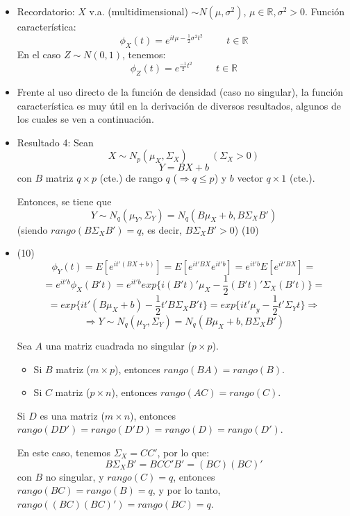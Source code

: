 \documentclass[11pt,a4paper]{article}
\begin{document}
\begin{itemize}
\item Recordatorio: $X$ v.a. (multidimensional) $\sim N(\mu, \sigma^{2})$, $\mu \in \mathbb{R}, \sigma^{2} > 0$. Función característica:
$$\phi_{X}(t) = e^{it\mu - \frac{1}{2}\sigma^{2}t^{2}} \hspace{1cm} t \in \mathbb{R}$$
En el caso $Z \sim N(0, 1)$, tenemos:
$$\phi_{Z}(t) = e^{\frac{-1}{2}t^{2}} \hspace{1cm} t \in \mathbb{R}$$

\item Frente al uso directo de la función de densidad (caso no singular), la función característica es muy útil en la derivación de diversos resultados, algunos de los cuales se ven a continuación.

\item Resultado 4: Sean
$$X \sim N_{p}(\mu_{X}, \Sigma_{X}) \hspace{1cm} (\Sigma_{X} > 0)$$
$$Y = BX + b$$
con $B$ matriz $q \times p$ (cte.) de rango $q$ ($\Rightarrow q \leq p$) y $b$ vector $q \times 1$ (cte.).

Entonces, se tiene que
$$Y \sim N_{q}(\mu_{Y}, \Sigma_{Y}) = N_{q}(B\mu_{X}+b, B\Sigma_{X}B')$$
(siendo $rango(B\Sigma_{X}B') = q$, es decir, $B\Sigma_{X}B' > 0$) \hspace{1cm} (10)

\item (10) $$\phi_{Y}(t) = E[e^{it'(BX + b)}] = E[e^{it'BX} e^{it'b}] = e^{it'b} E[e^{it'BX}] =$$
$$= e^{it'b} \phi_{X}(B't) = e^{it'b} exp\{i(B't)'\mu_{X} - \frac{1}{2}(B't)'\Sigma_{X}(B't)\} =$$
$$= exp\{it'(B\mu_{X}+b) - \frac{1}{2}t'B\Sigma_{X}B't\} = exp\{it'\mu_{y} - \frac{1}{2}t'\Sigma_{Y}t\} \Rightarrow$$
$$\Rightarrow Y \sim N_{q}(\mu_{Y}, \Sigma_{Y}) = N_{q}(B\mu_{X}+b, B\Sigma_{X}B')$$ 

Sea $A$ una matriz cuadrada no singular ($p \times p$).
\begin{itemize}
\item Si $B$ matriz ($m \times p$), entonces $rango(BA) = rango(B)$.
\item Si $C$ matriz ($p \times n$), entonces $rango(AC) = rango(C)$.
\end{itemize}
Si $D$ es una matriz ($m \times n$), entonces $rango(DD') = rango(D'D) = rango(D) = rango(D')$.

En este caso, tenemos $\Sigma_{X} = CC'$, por lo que:
$$B\Sigma_{X}B' = BCC'B' = (BC)(BC)'$$
con $B$ no singular, y $rango(C) = q$, entonces $rango(BC) = rango(B) = q$, y por lo tanto, $rango((BC)(BC)') = rango(BC) = q$.
\end{itemize}
\end{document}

